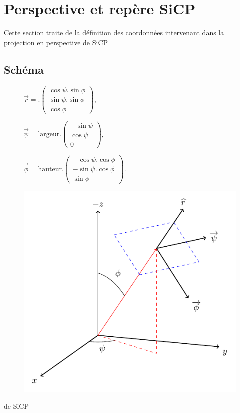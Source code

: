 

\section{Perspective et repère SiCP}
Cette section traite de la définition des coordonnées intervenant dans la projection en perspective de SiCP
\subsection{Schéma}
%
\begin{figure}
	\begin{minipage}[c]{.46\linewidth}
	$\overrightarrow{r}  = \text{} .
	\begin{pmatrix}
		\cos \psi . \sin \phi \\
		\sin \psi . \sin \phi \\
		\cos \phi
	\end{pmatrix}$,

	$\overrightarrow{\psi} = \text{largeur} .
	\begin{pmatrix}
		- \sin \psi \\
		\cos \psi \\
		0
	\end{pmatrix}$,

	$\overrightarrow{\phi} = \text{hauteur} .
	\begin{pmatrix}
		- \cos \psi . \cos \phi \\
		- \sin \psi . \cos \phi \\
		\sin \phi
	\end{pmatrix}$.
	\end{minipage} \hfill
	\begin{minipage}[c]{.46\linewidth}
	\includegraphics[scale=1]{./illustration/repereSiCP}
	\end{minipage}
\end{figure}
%
%
\begin{center}
 de SiCP
\end{center}


